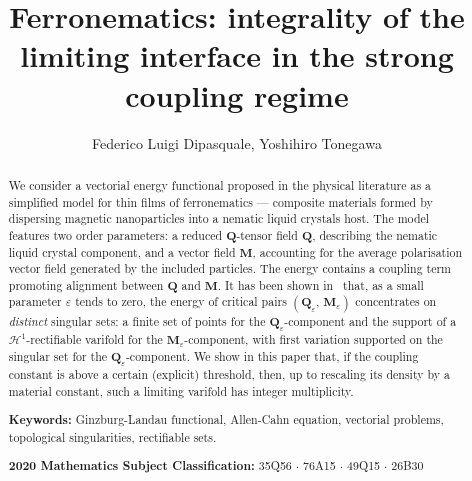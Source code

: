 \documentclass[a4paper, 11pt, twoside, leqno]{article}
\title{Ferronematics: integrality of the limiting interface in the strong coupling regime}
\author{Federico Luigi Dipasquale, Yoshihiro Tonegawa}
\date{}
\theoremstyle{definition}              %
\theoremstyle{remark}                  %
\newcommand{\Q}{\mathbf{Q}}
\newcommand{\M}{\mathbf{M}}
\renewcommand{\H}{\mathscr{H}}
\newcommand{\eps}{\varepsilon}
\begin{document}
\maketitle

\begin{abstract}
	We consider a vectorial energy functional proposed in the physical 
	literature as a simplified model for thin films of ferronematics --- composite 
	materials formed by dispersing magnetic nanoparticles into a 
	nematic liquid crystals host. The model features two order parameters: 
	a reduced $\Q$-tensor field $\Q$, describing the nematic liquid crystal component, 
	and a vector field $\M$, accounting for the average polarisation vector 
	field generated by the included particles. The energy contains a 
	coupling term promoting alignment between $\Q$ and $\M$.
	It has been shown in~\cite{CDS1,CDS2} 
	that, as a small parameter $\eps$ tends to zero, the energy of critical pairs 
	$(\Q_\eps,\,\M_\eps)$ concentrates on \emph{distinct} singular sets: a finite 
	set of points for the $\Q_\eps$-component and the support of a $\H^1$-rectifiable  
	varifold for the $\M_\eps$-component, with first variation supported on 
	the singular set for the $\Q_\eps$-component. 
	We show in this paper that, if the coupling constant is above a 
	certain (explicit) threshold, then, up to rescaling its density by a 
	material constant, such a  
	limiting varifold has integer multiplicity.
	
 \medskip
 \noindent
 \textbf{Keywords:}
 Ginzburg-Landau functional, Allen-Cahn equation, vectorial problems, topological singularities, rectifiable sets.

 \smallskip
 \noindent
 \textbf{2020 Mathematics Subject Classification:}
         35Q56 %
 $\cdot$ 76A15 %
 $\cdot$ 49Q15 %
 $\cdot$ 26B30 %
\end{abstract}
\end{document}
